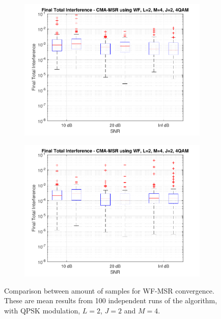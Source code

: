 \begin{figure}
\begin{subfigure}[b]{0.45\textwidth}
		\includegraphics[width=\linewidth]{./figs/BF_WF_MSR_TIfinal_4QAM_L=2_M=4_J=2_K=200.pdf}
		\label{fig:wf_msr_tidist200}
	\end{subfigure}
	\begin{subfigure}[b]{0.45\textwidth}
		\includegraphics[width=\linewidth]{./figs/BF_WF_MSR_TIfinal_4QAM_L=2_M=4_J=2_K=1000.pdf}
		\label{fig:wf_msr_tidist1000}
	\end{subfigure}
	\caption{Comparison between amount of samples for WF-MSR convergence. These are mean results from 100 independent runs of the algorithm, with QPSK modulation, $L=2$, $J=2$ and $M=4$.}
	\label{fig:CMA_WF_msr_qpsk_L2M4}
\end{figure}


